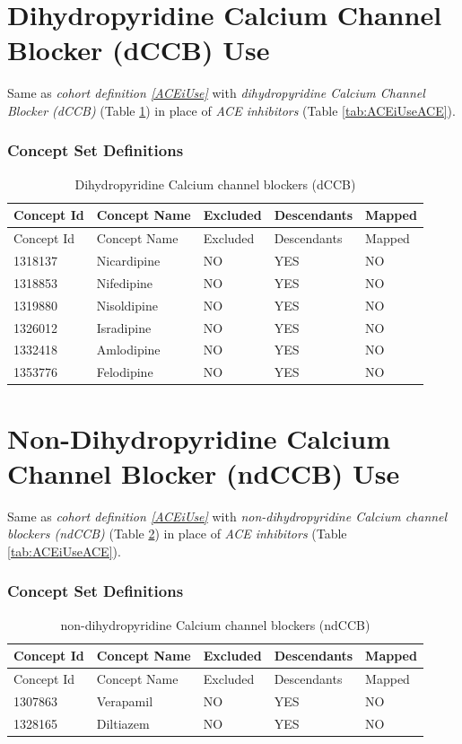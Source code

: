 \documentclass[11pt]{book}
\theoremstyle{definition}
\theoremstyle{definition}
\theoremstyle{definition}
\theoremstyle{remark}
\begin{document}
\section{Dihydropyridine Calcium Channel Blocker (dCCB)
Use}\label{dCCBUse}

Same as \emph{cohort definition \ref{ACEiUse}} with
\emph{dihydropyridine Calcium Channel Blocker (dCCB)} (Table
\ref{tab:dCCBUsedCBB}) in place of \emph{ACE inhibitors} (Table
\ref{tab:ACEiUseACE}).

\subsubsection*{Concept Set
Definitions}\label{concept-set-definitions-9}

\begin{longtable}[]{@{}lllll@{}}
\caption{\label{tab:dCCBUsedCBB} Dihydropyridine Calcium channel blockers
(dCCB)}\tabularnewline
\toprule
Concept Id & Concept Name & Excluded & Descendants &
Mapped\tabularnewline
\midrule
\endfirsthead
\toprule
Concept Id & Concept Name & Excluded & Descendants &
Mapped\tabularnewline
\midrule
\endhead
1318137 & Nicardipine & NO & YES & NO\tabularnewline
1318853 & Nifedipine & NO & YES & NO\tabularnewline
1319880 & Nisoldipine & NO & YES & NO\tabularnewline
1326012 & Isradipine & NO & YES & NO\tabularnewline
1332418 & Amlodipine & NO & YES & NO\tabularnewline
1353776 & Felodipine & NO & YES & NO\tabularnewline
\bottomrule
\end{longtable}

\section{Non-Dihydropyridine Calcium Channel Blocker (ndCCB)
Use}\label{ndCCBUse}

Same as \emph{cohort definition \ref{ACEiUse}} with
\emph{non-dihydropyridine Calcium channel blockers (ndCCB)} (Table
\ref{tab:ndCCBUsendCCB}) in place of \emph{ACE inhibitors} (Table
\ref{tab:ACEiUseACE}).

\subsubsection*{Concept Set
Definitions}\label{concept-set-definitions-10}

\begin{longtable}[]{@{}lllll@{}}
\caption{\label{tab:ndCCBUsendCCB} non-dihydropyridine Calcium channel
blockers (ndCCB)}\tabularnewline
\toprule
Concept Id & Concept Name & Excluded & Descendants &
Mapped\tabularnewline
\midrule
\endfirsthead
\toprule
Concept Id & Concept Name & Excluded & Descendants &
Mapped\tabularnewline
\midrule
\endhead
1307863 & Verapamil & NO & YES & NO\tabularnewline
1328165 & Diltiazem & NO & YES & NO\tabularnewline
\bottomrule
\end{longtable}
\end{document}
